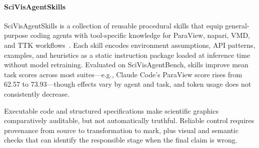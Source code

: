 \paragraph{SciVisAgentSkills}
SciVisAgentSkills is a collection of reusable procedural skills that equip general-purpose coding agents with tool-specific knowledge for ParaView, napari, VMD, and TTK workflows~\cite{avg260605525}. Each skill encodes environment assumptions, API patterns, examples, and heuristics as a static instruction package loaded at inference time without model retraining. Evaluated on SciVisAgentBench, skills improve mean task scores across most suites—e.g., Claude Code's ParaView score rises from 62.57 to 73.93—though effects vary by agent and task, and token usage does not consistently decrease.

Executable code and structured specifications make scientific graphics comparatively auditable, but not automatically truthful. Reliable control requires provenance from source to transformation to mark, plus visual and semantic checks that can identify the responsible stage when the final claim is wrong.

\FloatBarrier

